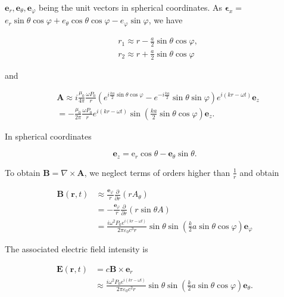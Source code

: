 \documentclass[10pt]{article}
\begin{document}
$\mathbf{e}_{r}, \mathbf{e}_{\theta}, \mathbf{e}_{\varphi}$ being the unit vectors in spherical coordinates. As $\boldsymbol{\epsilon}_{x}=$ $e_{r} \sin \theta \cos \varphi+e_{\theta} \cos \theta \cos \varphi-e_{\varphi} \sin \varphi$, we have

$$
\begin{aligned}
&r_{1} \approx r-\frac{a}{2} \sin \theta \cos \varphi, \\
&r_{2} \approx r+\frac{a}{2} \sin \theta \cos \varphi
\end{aligned}
$$

and

$$
\begin{aligned}
& \mathbf{A} \approx i \frac{\mu_{0}}{4 \pi} \frac{\omega P_{0}}{r}\left(e^{i \frac{k a}{2} \sin \theta \cos \varphi}-e^{-i \frac{k a}{2}} \sin \theta \sin \varphi\right) e^{i(k r-\omega t)} \mathbf{e}_{z} \\
& =-\frac{\mu_{0}}{2 \pi} \frac{\omega P_{0}}{r} e^{i(k r-\omega t)} \sin \left(\frac{k a}{2} \sin \theta \cos \varphi\right) \mathbf{e}_{z} .
\end{aligned}
$$

In spherical coordinates

$$
\mathbf{e}_{z}=\mathrm{e}_{r} \cos \theta-\mathbf{e}_{\theta} \sin \theta .
$$

To obtain $\mathbf{B}=\nabla \times \mathbf{A}$, we neglect terms of orders higher than $\frac{1}{r}$ and obtain

$$
\begin{aligned}
\mathbf{B}(\mathbf{r}, t) & \approx \frac{\mathbf{e}_{\varphi}}{r} \frac{\partial}{\partial r}\left(r A_{\theta}\right) \\
&=-\frac{\mathbf{e}_{\varphi}}{r} \frac{\partial}{\partial r}(r \sin \theta A) \\
&=\frac{i \omega^{2} P_{0} e^{i(k r-\omega t)}}{2 \pi \varepsilon_{0} c^{3} r} \sin \theta \sin \left(\frac{k}{2} a \sin \theta \cos \varphi\right) \mathbf{e}_{\varphi}
\end{aligned}
$$

The associated electric field intensity is

$$
\begin{aligned}
\mathbf{E}(\mathbf{r}, t) &=c \mathbf{B} \times \mathbf{e}_{r} \\
& \approx \frac{i \omega^{2} P_{0} e^{i(k r-\omega t)}}{2 \pi \varepsilon_{0} c^{2} r} \sin \theta \sin \left(\frac{k}{2} a \sin \theta \cos \varphi\right) \mathbf{e}_{\theta} .
\end{aligned}
$$
\end{document}
